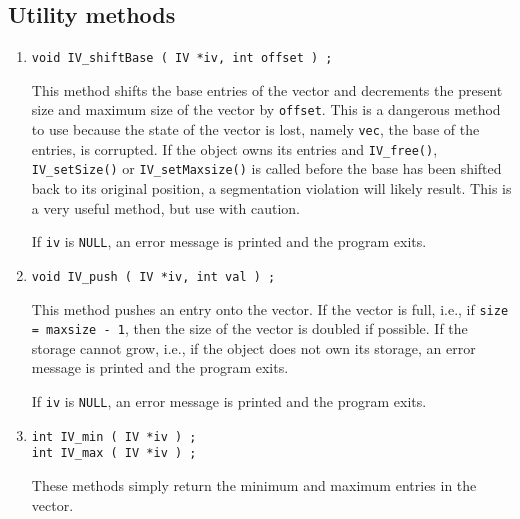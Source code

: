 \subsection{Utility methods}
\label{subsection:IV:proto:utilities}
\par
\par
\begin{enumerate}
\item
\begin{verbatim}
void IV_shiftBase ( IV *iv, int offset ) ;
\end{verbatim}
This method shifts the base entries of the vector and decrements
the present size and maximum size of the vector by {\tt offset}.
This is a dangerous method to use because the state of the vector
is lost, namely {\tt vec}, the base of the entries, is corrupted.
If the object owns its entries and {\tt IV\_free()}, 
{\tt IV\_setSize()} or {\tt IV\_setMaxsize()} 
is called before the base has been shifted back to
its original position, a segmentation violation will likely result.
This is a very useful method, but use with caution.
\par {}
If {\tt iv} is {\tt NULL},
an error message is printed and the program exits.
\item
\begin{verbatim}
void IV_push ( IV *iv, int val ) ;
\end{verbatim}
This method pushes an entry onto the vector.
If the vector is full, i.e., if {\tt size = maxsize - 1},
then the size of the vector is doubled if possible.
If the storage cannot grow, i.e., if the object does not own its
storage, an error message is printed and the program exits.
\par {}
If {\tt iv} is {\tt NULL},
an error message is printed and the program exits.
\item
\begin{verbatim}
int IV_min ( IV *iv ) ;
int IV_max ( IV *iv ) ;
\end{verbatim}
These methods simply return the minimum and maximum entries in the
vector.

\end{enumerate}
